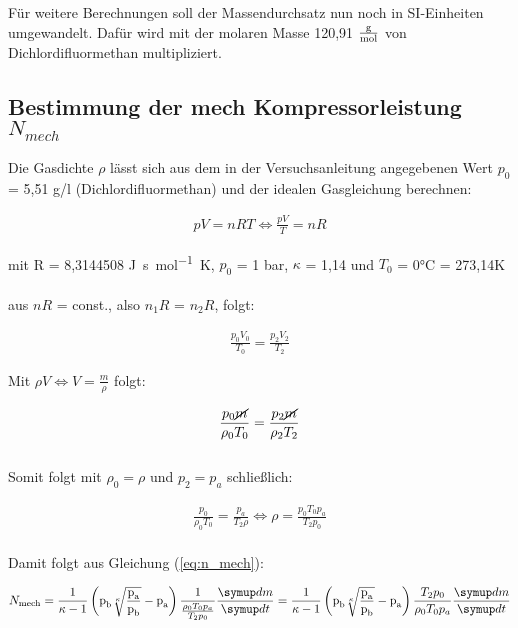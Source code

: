 {{Für weitere Berechnungen soll der Massendurchsatz nun noch in SI-Einheiten umgewandelt. Dafür wird mit der molaren Masse
120,91 $\unit[per-mode=fraction]{\gram\per\mol}$ von Dichlordifluormethan multipliziert. 


\subsection{Bestimmung der mech Kompressorleistung $N_{mech}$}

Die Gasdichte $\rho$ lässt sich aus dem in der Versuchsanleitung \cite[7]{v206} angegebenen Wert 
$p_{0}$ = 5,51 g/l (Dichlordifluormethan) und der idealen Gasgleichung berechnen:

\begin{align*}
  pV = nRT \iff \frac{pV}{T} = nR
\end{align*}

mit R = 8,3144508 \unit[per-mode=fraction]{\joule\second\per\mol\kelvin}, $p_{0}$ = 1 bar, $\kappa$ = 1,14 und
$T_{0}$ = 0\unit{\celsius} = 273,14\unit{\kelvin}\\
\\
aus $nR$ = const., also $n_{1}R$ = $n_{2}R$, folgt:

\begin{align*}
  \frac{p_{0}V_{0}}{T_{0}} = \frac{p_{2}V_{2}}{T_{2}}
\end{align*}

Mit $\rho V \iff V = \frac{m}{\rho}$ folgt:

\begin{align*}
  \frac{p_{0}\cancel{m}}{\rho_{0}T_{0}} = \frac{p_{2}\cancel{m}}{\rho_{2}T_{2}}
\end{align*} \\

Somit folgt mit $\rho_{0} = \rho$ und $p_{2} = p_{a}$ schließlich:

\begin{align}
  \frac{p_{0}}{\rho_{0}T_{0}} = \frac{p_{a}}{T_{2}\rho} \iff \rho = \frac{p_{0}T_{0}p_{a}}{T_{2}p_{0}}
\end{align}\\

Damit folgt aus Gleichung (\ref{eq:n_mech}):

\begin{equation*}
  N_\text{mech} = 
  \frac{1}{\kappa - 1} 
  \left(\text{p}_\text{b} \sqrt[\kappa]{\frac {\text{p}_\text{a}} {\text{p}_\text{b}}} - \text{p}_\text{a} \right)
  \frac{1} {\frac {\rho_{0}T_{0}p_{a}} {T_{2}p_{0}}} \frac{\dif{m}}{\dif{t}} 
  =
  \frac{1}{\kappa - 1} 
  \left(\text{p}_\text{b} \sqrt[\kappa]{\frac {\text{p}_\text{a}} {\text{p}_\text{b}}} - \text{p}_\text{a} \right)
  \frac {T_{2}p_{0}} {\rho_{0}T_{0}p_{a}} \frac{\dif{m}}{\dif{t}}
\end{equation*} \\

}}
